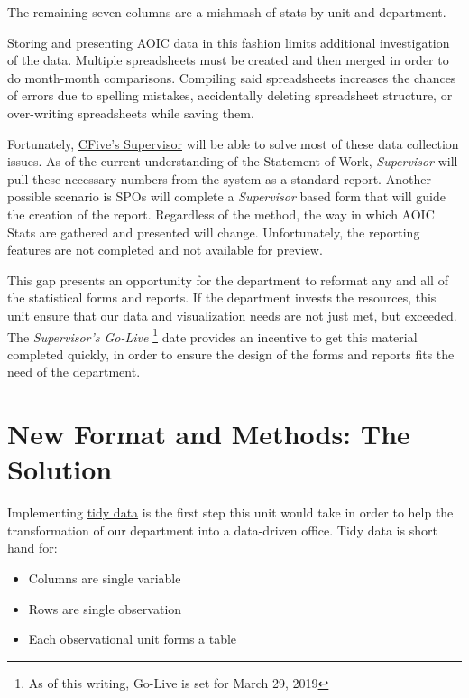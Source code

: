 \documentclass[12pt,]{article}
\providecommand{\tightlist}{%
  \setlength{\itemsep}{0pt}\setlength{\parskip}{0pt}}
\let\rmarkdownfootnote\footnote%
\def\footnote{\protect\rmarkdownfootnote}
\begin{document}
The remaining seven columns are a mishmash of stats by unit and
department.

Storing and presenting AOIC data in this fashion limits additional
investigation of the data. Multiple spreadsheets must be created and
then merged in order to do month-month comparisons. Compiling said
spreadsheets increases the chances of errors due to spelling mistakes,
accidentally deleting spreadsheet structure, or over-writing
spreadsheets while saving them.

Fortunately, \href{https://www.cfive.com/products/supervisor/}{CFive's
Supervisor} will be able to solve most of these data collection issues.
As of the current understanding of the Statement of Work,
\emph{Supervisor} will pull these necessary numbers from the system as a
standard report. Another possible scenario is SPOs will complete a
\emph{Supervisor} based form that will guide the creation of the report.
Regardless of the method, the way in which AOIC Stats are gathered and
presented will change. Unfortunately, the reporting features are not
completed and not available for preview.

This gap presents an opportunity for the department to reformat any and
all of the statistical forms and reports. If the department invests the
resources, this unit ensure that our data and visualization needs are
not just met, but exceeded. The \emph{Supervisor's Go-Live }\footnote{As
  of this writing, Go-Live is set for March 29, 2019} date provides an
incentive to get this material completed quickly, in order to ensure the
design of the forms and reports fits the need of the department.

\hypertarget{new-format-and-methods-the-solution}{%
\section{New Format and Methods: The
Solution}\label{new-format-and-methods-the-solution}}

Implementing \href{http://vita.had.co.nz/papers/tidy-data.html}{tidy
data} is the first step this unit would take in order to help the
transformation of our department into a data-driven office. Tidy data is
short hand for:

\begin{itemize}
\tightlist
\item
  Columns are single variable
\item
  Rows are single observation
\item
  Each observational unit forms a table
\end{itemize}
\end{document}
